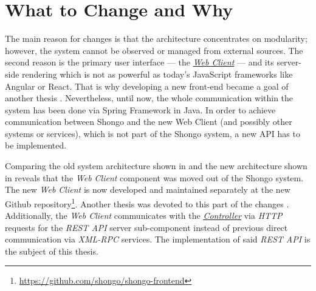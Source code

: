 \section{What to Change and Why}

The main reason for changes is that the architecture concentrates on modularity; however, the system cannot be observed or managed from external sources.
The second reason is the primary user interface --- the \hyperref[webclient]{\emph{Web Client}} --- and its server-side rendering which is not as powerful as today's JavaScript frameworks like Angular or React.
That is why developing a new front-end became a goal of another thesis \cite{drobnakm}.
Nevertheless, until now, the whole communication within the system has been done via Spring Framework in Java. In order to achieve communication between Shongo and the new Web Client (and possibly other systems or services), which is not part of the Shongo system, a new API has to be implemented.


Comparing the old system architecture shown in  and the new architecture shown in  reveals that the \emph{Web Client} component was moved out of the Shongo system. The new \emph{Web Client} is now developed and maintained separately at the new Github repository\footnote{\url{https://github.com/shongo/shongo-frontend}}. Another thesis was devoted to this part of the changes \cite{drobnakm}.
Additionally, the \emph{Web Client} communicates with the \hyperref[controller]{\emph{Controller}} via \emph{HTTP} requests for the \emph{REST API} server sub-component instead of previous direct communication via \emph{XML-RPC} services. The implementation of said \emph{REST API} is the subject of this thesis.
